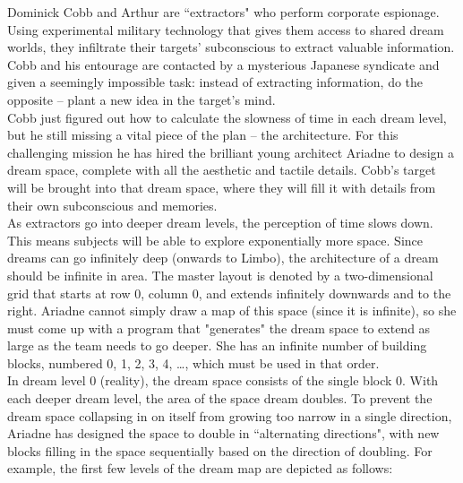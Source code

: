 
\noindent Dominick Cobb and Arthur are ``extractors" who perform corporate espionage. Using experimental military technology that gives them access to shared dream worlds, they infiltrate their targets' subconscious to extract valuable information. Cobb and his entourage are contacted by a mysterious Japanese syndicate and given a seemingly impossible task: instead of extracting information, do the opposite -- plant a new idea in the target's mind.\\

Cobb just figured out how to calculate the slowness of time in each dream level, but he still missing a vital piece of the plan -- the architecture. For this challenging mission he has hired the brilliant young architect Ariadne to design a dream space, complete with all the aesthetic and tactile details. Cobb's target will be brought into that dream space, where they will fill it with details from their own subconscious and memories.\\

As extractors go into deeper dream levels, the perception of time slows down. This means subjects will be able to explore exponentially more space. Since dreams can go infinitely deep (onwards to Limbo), the architecture of a dream should be infinite in area. The master layout is denoted by a two-dimensional grid that starts at row 0, column 0, and extends infinitely downwards and to the right. Ariadne cannot simply draw a map of this space (since it is infinite), so she must come up with a program that "generates" the dream space to extend as large as the team needs to go deeper. She has an infinite number of building blocks, numbered 0, 1, 2, 3, 4, \dots, which must be used in that order.\\

In dream level 0 (reality), the dream space consists of the single block 0. With each deeper dream level, the area of the space dream doubles. To prevent the dream space collapsing in on itself from growing too narrow in a single direction, Ariadne has designed the space to double in ``alternating directions", with new blocks filling in the space sequentially based on the direction of doubling. For example, the first few levels of the dream map are depicted as follows:\\

